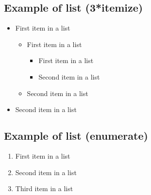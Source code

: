 \documentclass[paper=a4, fontsize=11pt]{scrartcl} %
\numberwithin{equation}{section} %
\numberwithin{figure}{section} %
\numberwithin{table}{section} %
\begin{document}

\subsection{Example of list (3*itemize)}
\begin{itemize}
	\item First item in a list 
		\begin{itemize}
		\item First item in a list 
			\begin{itemize}
			\item First item in a list 
			\item Second item in a list 
			\end{itemize}
		\item Second item in a list 
		\end{itemize}
	\item Second item in a list 
\end{itemize}


\subsection{Example of list (enumerate)}
\begin{enumerate}
\item First item in a list 
\item Second item in a list 
\item Third item in a list
\end{enumerate}

\end{document}
